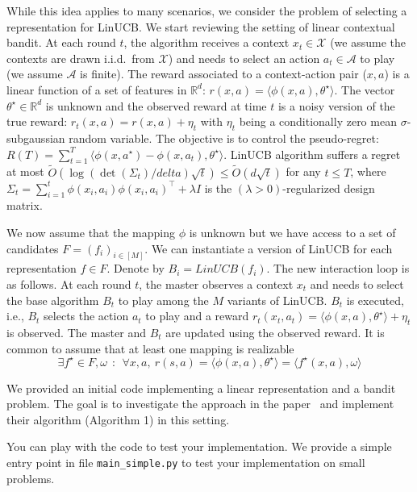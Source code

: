 \documentclass[a4paper]{article}
\newcommand{\wt}[1]{\widetilde{#1}}
\begin{document}
\vspace{.2in}
While this idea applies to many scenarios, we consider the problem of selecting a representation for LinUCB.
We start reviewing the setting of linear contextual bandit.
At each round $t$, the algorithm receives a context $x_t \in \mathcal{X}$ (we assume the contexts are drawn i.i.d.\ from $\mathcal{X}$) and needs to select an action $a_t \in \mathcal{A}$ to play (we assume $\mathcal{A}$ is finite).
The reward associated to a context-action pair ($x,a$) is a linear function of a set of features in $\mathbb{R}^d$: $r(x,a) = \langle \phi(x,a), \theta^\star \rangle$. The vector $\theta^\star \in \mathbb{R}^d$ is unknown and the observed reward at time $t$ is a noisy version of the true reward: $r_t(x,a) = r(x,a) + \eta_t$ with $\eta_t$ being a conditionally zero mean $\sigma$-subgaussian random variable. The objective is to control the pseudo-regret: $R(T) = \sum_{t=1}^T \langle \phi(x, a^\star) - \phi(x,a_t), \theta^\star \rangle$. LinUCB algorithm suffers a regret at most $\wt{O}(\log(\det(\Sigma_t)/delta) \sqrt{t}) \leq \wt{O}(d\sqrt{t})$ for any $t \leq T$, where $\Sigma_t = \sum_{i=1}^t  \phi(x_i, a_i) \phi(x_i, a_i)^\top + \lambda I$ is the $(\lambda>0)$-regularized design matrix.

We now assume that the mapping $\phi$ is unknown but we have access to a set of candidates $F = (f_i)_{i \in [M]}$. We can instantiate a version of LinUCB for each representation $f \in F$. Denote by $B_i = LinUCB(f_i)$.
The new interaction loop is as follows. At each round $t$, the master observes a context $x_t$ and needs to select the base algorithm $B_t$ to play among the $M$ variants of LinUCB. $B_t$ is executed, i.e., $B_t$ selects the action $a_t$ to play and a reward $r_t(x_t,a_t) = \langle \phi(x,a), \theta^\star \rangle + \eta_t$ is observed. The master and $B_t$ are updated using the observed reward.
It is common to assume that at least one mapping is realizable
\[
   \exists f^\star \in F, \omega ~~:~~ \forall x,a, ~ r(s,a) = \langle \phi(x,a), \theta^\star \rangle =
   \langle f^\star(x,a), \omega \rangle
\]


\vspace{.2in}
We provided an initial code implementing a linear representation and a bandit problem. The goal is to investigate the approach in the paper~\citep{pacchiano2020regret} and implement their algorithm (Algorithm 1) in this setting.

You can play with the code to test your implementation. We provide a simple entry point in file \texttt{main\_simple.py} to test your implementation on small problems.
\end{document}
